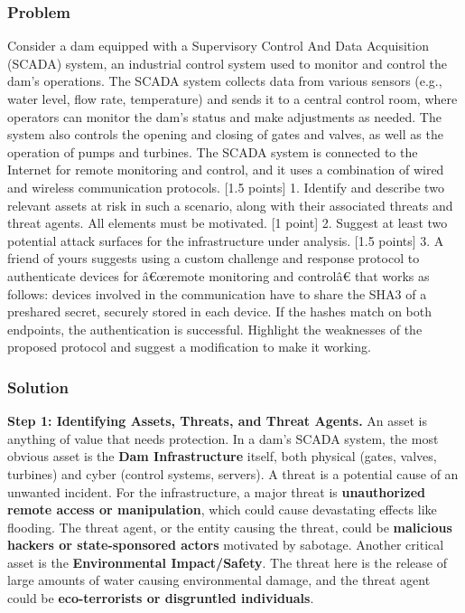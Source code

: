 \documentclass{article}
\begin{document}
\subsubsection*{Problem}
Consider a dam equipped with a Supervisory Control And Data Acquisition (SCADA) system, an industrial control system used to monitor and control the dam's operations. The SCADA system collects data from various sensors (e.g., water level, flow rate, temperature) and sends it to a central control room, where operators can monitor the dam's status and make adjustments as needed. The system also controls the opening and closing of gates and valves, as well as the operation of pumps and turbines. The SCADA system is connected to the Internet for remote monitoring and control, and it uses a combination of wired and wireless communication protocols.
[1.5 points] 1. Identify and describe two relevant assets at risk in such a scenario, along with their associated threats and threat agents. All elements must be motivated.
[1 point] 2. Suggest at least two potential attack surfaces for the infrastructure under analysis.
[1.5 points] 3. A friend of yours suggests using a custom challenge and response protocol to authenticate devices for â€œremote monitoring and controlâ€ that works as follows: devices involved in the communication have to share the SHA3 of a preshared secret, securely stored in each device. If the hashes match on both endpoints, the authentication is successful. Highlight the weaknesses of the proposed protocol and suggest a modification to make it working.

\subsubsection*{Solution}
\textbf{Step 1: Identifying Assets, Threats, and Threat Agents.}
An asset is anything of value that needs protection. In a dam's SCADA system, the most obvious asset is the \textbf{Dam Infrastructure} itself, both physical (gates, valves, turbines) and cyber (control systems, servers). A threat is a potential cause of an unwanted incident. For the infrastructure, a major threat is \textbf{unauthorized remote access or manipulation}, which could cause devastating effects like flooding. The threat agent, or the entity causing the threat, could be \textbf{malicious hackers or state-sponsored actors} motivated by sabotage. Another critical asset is the \textbf{Environmental Impact/Safety}. The threat here is the release of large amounts of water causing environmental damage, and the threat agent could be \textbf{eco-terrorists or disgruntled individuals}.
\end{document}
